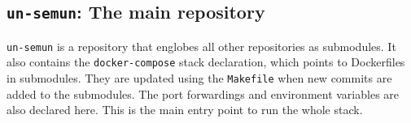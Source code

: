 
\subsection{\texttt{un-semun}: The main repository} \label{ssec:un-semun-the-main-repository}

\texttt{un-semun} is a repository that englobes all other repositories as submodules. It also contains the \texttt{docker-compose} stack declaration, which points to Dockerfiles in submodules. They are updated using the \texttt{Makefile} when new commits are added to the submodules. The port forwardings and environment variables are also declared here. This is the main entry point to run the whole stack.
